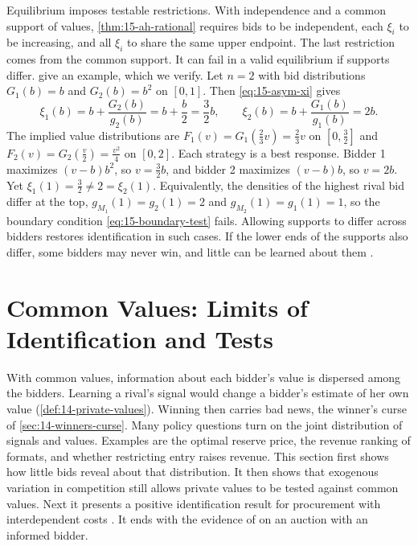 Equilibrium imposes testable restrictions. With independence and a common support of values,
\cref{thm:15-ah-rational} requires bids to be independent, each $\xi_i$ to be increasing, and all $\xi_i$ to
share the same upper endpoint. The last restriction comes from the common support. It can fail in a valid
equilibrium if supports differ. \citet[Section~5.1]{AtheyHaile2007} give an example, which we verify. Let
$n=2$ with bid distributions $G_1(b)=b$ and $G_2(b)=b^2$ on $[0,1]$. Then \eqref{eq:15-asym-xi} gives
\begin{equation*}
  \xi_1(b)=b+\frac{G_2(b)}{g_2(b)}=b+\frac b2=\frac32b,
  \qquad
  \xi_2(b)=b+\frac{G_1(b)}{g_1(b)}=2b .
\end{equation*}
The implied value distributions are $F_1(v)=G_1(\frac23v)=\frac23v$ on $[0,\frac32]$ and
$F_2(v)=G_2(\frac v2)=\frac{v^2}{4}$ on $[0,2]$. Each strategy is a best response. Bidder 1 maximizes
$(v-b)b^2$, so $v=\frac32b$, and bidder 2 maximizes $(v-b)b$, so $v=2b$. Yet $\xi_1(1)=\frac32\ne2=\xi_2(1)$.
Equivalently, the densities of the highest rival bid differ at the top, $g_{M_1}(1)=g_2(1)=2$ and
$g_{M_2}(1)=g_1(1)=1$, so the boundary condition \eqref{eq:15-boundary-test} fails.
Allowing supports to differ across bidders restores identification in such cases. If the lower ends of the
supports also differ, some bidders may never win, and little can be learned about them
\citep[Section~5.1]{AtheyHaile2007}.

\section{Common Values: Limits of Identification and Tests}\label{sec:15-cv}

With common values, information about each bidder's value is dispersed among the bidders. Learning a
rival's signal would change a bidder's estimate of her own value (\cref{def:14-private-values}). Winning then
carries bad news, the winner's curse of \cref{sec:14-winners-curse}. Many policy questions turn on the joint
distribution of signals and values. Examples are the optimal reserve price, the revenue ranking of formats,
and whether restricting entry raises revenue. This section first shows how little bids reveal about that
distribution. It then shows that exogenous variation in competition still allows private values to be tested
against common values. Next it presents a positive identification result for procurement with interdependent
costs \citep{Somaini2020}. It ends with the evidence of \citet{HendricksPorter1988} on an auction with an
informed bidder.

